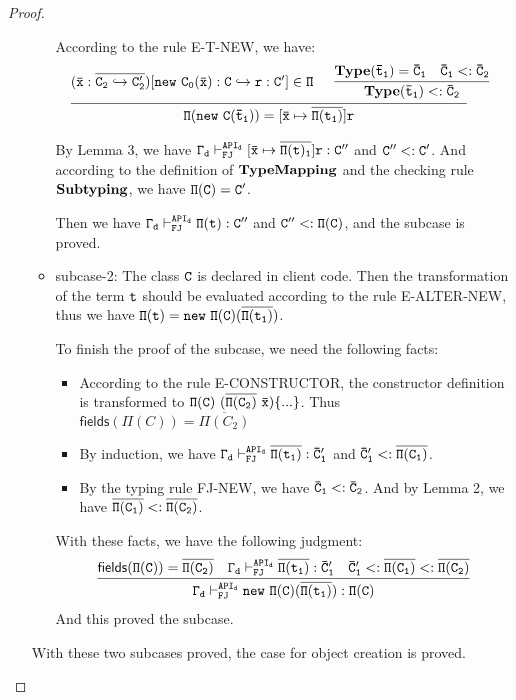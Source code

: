 \documentclass[letterpaper]{article}
\newcommand{\env}[2]{\vdash_{#1}^{#2}}
\begin{document}
\begin{proof}
\begin{itemize}
\begin{itemize}
    According to the rule E-T-NEW, we have:
    \[
      \begin{array}{c c}
        \infer
        {\tt \Pi(new~C(\bar{t}_1))=[\bar{x}\mapsto \overline{\Pi(t_1)}]r}
        {\tt (\bar{x}:\overline{C_2 \hookrightarrow C'_2})[new~C_0(\bar{x}):C\hookrightarrow r:C']\in\Pi
        & \begin{array}{c c}
            \infer
            {\tt \mathbf{Type}(\bar{t}_1)<:\bar{C}_2}
            {\tt \mathbf{Type}(\bar{t}_1)=\bar{C}_1
            &\tt \bar{C}_1 <:\bar{C}_2}
          \end{array}}
      \end{array}
    \]

    By Lemma 3, we have $\tt \Gamma_d\env{FJ}{API_d}[\bar{x}\mapsto \overline{\Pi(t)_1}]r : C''$ and $\tt C'' <: C'$. And according to the definition of $\tt \mathbf{TypeMapping}$ and the checking rule $\tt \mathbf{Subtyping}$, we have $\tt \Pi(C)=C'$. 

    Then we have $\tt \Gamma_d\env{FJ}{API_d} \Pi(t):C''$ and $\tt C'' <: \Pi(C)$, and the subcase is proved.

    \item subcase-2: The class $\tt C$ is declared in client code. Then the transformation of the term $\tt t$ should be evaluated according to the rule E-ALTER-NEW, thus we have $\tt \Pi(t)=new~\Pi(C)(\overline{\Pi(t_1)})$.

    To finish the proof of the subcase, we need the following facts:
    \begin{itemize}
      \item According to the rule E-CONSTRUCTOR, the constructor definition is transformed to $\tt \Pi(C)~(\overline{\Pi(C_2)}~\bar{x}) \{...\}$. Thus $\mathsf{fields}(\Pi(C))=\overline{\Pi(C_2)}$
      \item By induction, we have $\tt \Gamma_d\env{FJ}{API_d}\overline{\Pi(t_1)}:\bar{C}'_1$ and $\tt \bar{C}'_1 <: \overline{\Pi(C_1)}$.
      \item By the typing rule FJ-NEW, we have $\tt \bar{C}_1<:\bar{C}_2$. And by Lemma 2, we have $\tt \overline{\Pi(C_1)} <:\overline{\Pi(C_2)}$.
    \end{itemize}
    With these facts, we have the following judgment:
    \[
      \begin{array}{ccc}
      \infer
      {\tt \Gamma_d\env{FJ}{API_d}new~\Pi(C)(\overline{\Pi(t_1)}):\Pi(C)}
      {
       \tt \mathsf{fields}(\Pi(C))=\overline{\Pi(C_2)}
      &\tt \Gamma_d\env{FJ}{API_d}\overline{\Pi(t_1)}:\bar{C}'_1
      &\tt \bar{C}'_1<:\overline{\Pi(C_1)} <:\overline{\Pi(C_2)}
      }
      \end{array}
    \]
    And this proved the subcase.
  \end{itemize} 
  With these two subcases proved, the case for object creation is proved.


\end{itemize}
\end{proof}
\end{document}
